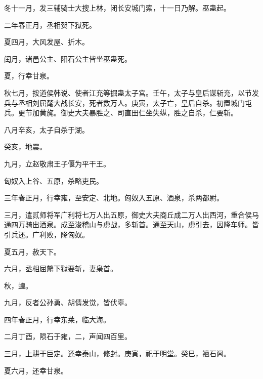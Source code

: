 \documentclass[12pt,UTF8]{ctexbook}
\begin{document}
冬十一月，发三辅骑士大搜上林，闭长安城门索，十一日乃解。巫蛊起。



二年春正月，丞相贺下狱死。



夏四月，大风发屋、折木。



闰月，诸邑公主、阳石公主皆坐巫蛊死。



夏，行幸甘泉。



秋七月，按道侯韩说、使者江充等掘蛊太子宫。壬午，太子与皇后谋斩充，以节发兵与丞相刘屈氂大战长安，死者数万人。庚寅，太子亡，皇后自杀。初置城门屯兵。更节加黄旄。御史大夫暴胜之、司直田仁坐失纵，胜之自杀，仁要斩。



八月辛亥，太子自杀于湖。



癸亥，地震。



九月，立赵敬肃王子偃为平干王。



匈奴入上谷、五原，杀略吏民。



三年春正月，行幸雍，至安定、北地。匈奴入五原、酒泉，杀两都尉。



三月，遣贰师将军广利将七万人出五原，御史大夫商丘成二万人出西河，重合侯马通四万骑出酒泉。成至浚稽山与虏战，多斩首。通至天山，虏引去，因降车师。皆引兵还。广利败，降匈奴。



夏五月，赦天下。



六月，丞相屈氂下狱要斩，妻枭首。



秋，蝗。



九月，反者公孙勇、胡倩发觉，皆伏辜。



四年春正月，行幸东莱，临大海。



二月丁酉，陨石于雍，二，声闻四百里。



三月，上耕于巨定。还幸泰山，修封。庚寅，祀于明堂。癸巳，襢石闾。



夏六月，还幸甘泉。
\end{document}
